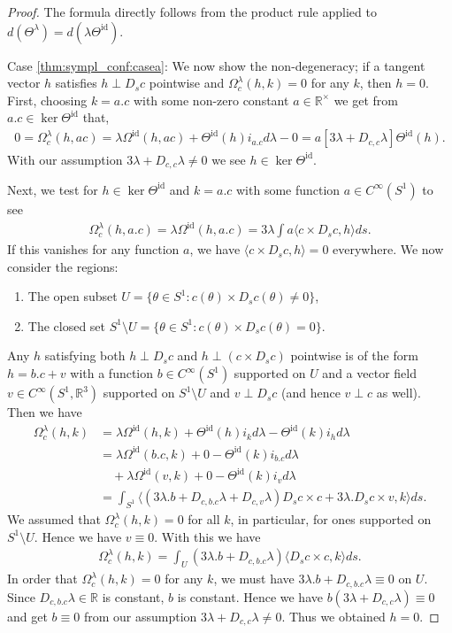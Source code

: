 \documentclass[12pt]{amsart}
\theoremstyle{definition}
\newcommand{\R}{\mathbb R}
\newcommand{\id}{\mathrm{id}}
\def\th{\theta}
\def\la{\lambda}
\def\Th{\Theta}
\def\Om{\Omega}
\def\x{\times}
\def\R{{\mathbb R}}
\begin{document}
\begin{proof}
    The formula directly follows from the product rule applied to $d(\Th^\la)=d(\la \Th^\id)$.

    Case \ref{thm:sympl_conf:casea}: We now show the non-degeneracy; if a tangent vector $h$ satisfies  $h\perp D_s c$ pointwise and $\Om^\la_c(h,k)= 0$ for any $k$, then $h=0$.
    First, choosing $k=a.c$ with some non-zero constant $a\in \R^\x$ we get from $a.c\in \ker \Th^\id$ that, 
    \begin{align}
        0=\Om^\la_c(h,ac)=\la\Om^\id(h,ac)+\Th^\id(h)i_{a.c}d\la-0=a [3\la + D_{c,c}\la]\Th^\id(h).
    \end{align}
    With our assumption $3\la + D_{c,c}\la\neq 0$ we see $h\in\ker \Th^\id$. 

    Next, we test for $h\in\ker \Th^\id$ and $k=a.c$ with some function $a\in C^\infty(S^1)$ to see 
    \begin{align}
        \Om^\la_c(h,a.c)
        =\la\Om^\id(h,a.c)
        =3\la\int a\langle c \x D_s c, h\rangle ds.
    \end{align}
    If this vanishes for any function $a$, we have $\langle c \x D_s c, h\rangle=0$ everywhere. 
    We now consider the regions:
\begin{enumerate}
    \item[(i)] The open subset $U = \{\th\in S^1: c(\th)\x D_sc(\th)\ne 0 \}$,
    \item[(ii)] The closed set  $S^1\setminus U=\{\th\in S^1: c(\th)\x D_sc(\th) = 0\}$.
\end{enumerate}
    Any $h$ satisfying both $h\perp D_s c$ and $h \perp  (c \x D_s c)$ pointwise is of the form $h=b.c+v$ with a function $b\in C^\infty(S^1)$ supported on $U$ and a vector field $v\in C^\infty(S^1,\R^3)$ supported on $S^1\setminus U$ and $v\perp D_s c$ (and hence $v\perp c$ as well).
    Then we have
    \begin{align}
        \Om^\la_c(h,k)
        &=\la \Om^\id(h,k)+\Th^\id(h)i_k d\la-\Th^\id(k)i_h d\la\\
        &=\la \Om^\id(b.c,k)+0-\Th^\id(k)i_{b.c}d\la\\
        &\quad + \la \Om^\id(v,k)+0-\Th^\id(k)i_v d\la\\
        &=\int_{S^1} \langle (3\la.b + D_{c,b.c}\la + D_{c,v}\la) D_s c \x c+ 3 \la. D_s c \x v, k\rangle ds.
    \end{align}
    We assumed that $\Om^\la_c(h,k)=0$ for all $k$, in particular, for ones supported on $S^1\setminus U$. Hence we have $v\equiv 0$. With this we have
    \begin{align}
        \Om^\la_c(h,k)=\int_{U} (3\la.b + D_{c,b.c}\la)  \langle D_s c \x c, k\rangle ds.
    \end{align}
     In order that $ \Om^\la_c(h,k)=0$ for any $k$, we must have $3\la.b + D_{c,b.c}\la\equiv 0$ on $U$. Since $D_{c,b.c}\la \in \mathbb R$ is constant, $b$ is constant. Hence we have  $b(3\la + D_{c,c}\la)\equiv 0$ and get $b\equiv 0$ from our assumption $3\la + D_{c,c}\la\neq 0$. Thus we obtained $h=0$.



\end{proof}
\end{document}
